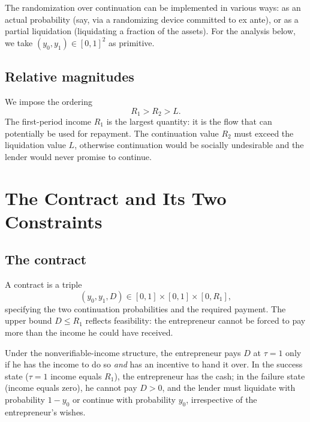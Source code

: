\documentclass[11pt,a4paper,oneside]{book}
\def\leq{\leqslant}
\theoremstyle{plain}
\theoremstyle{definition}
\theoremstyle{remark}
\numberwithin{equation}{chapter}
\begin{document}
The randomization over continuation can be implemented in various ways: as an actual probability (say, via a randomizing device committed to ex ante), or as a partial liquidation (liquidating a fraction of the assets).
For the analysis below, we take $(y_0, y_1) \in [0, 1]^2$ as primitive.

\subsection{Relative magnitudes}

We impose the ordering
\begin{equation}\label{eq:NV-ordering}
  R_1 > R_2 > L.
\end{equation}
The first-period income $R_1$ is the largest quantity: it is the flow that can potentially be used for repayment.
The continuation value $R_2$ must exceed the liquidation value $L$, otherwise continuation would be socially undesirable and the lender would never promise to continue.

\section{The Contract and Its Two Constraints}
\label{sec:NV-contract}

\subsection{The contract}

A contract is a triple
\begin{equation*}
  (y_0, y_1, D) \in [0,1] \times [0,1] \times [0, R_1],
\end{equation*}
specifying the two continuation probabilities and the required payment.
The upper bound $D \leq R_1$ reflects feasibility: the entrepreneur cannot be forced to pay more than the income he could have received.

Under the nonverifiable-income structure, the entrepreneur pays $D$ at $\tau = 1$ only if he has the income to do so \emph{and} has an incentive to hand it over.
In the success state ($\tau = 1$ income equals $R_1$), the entrepreneur has the cash; in the failure state (income equals zero), he cannot pay $D > 0$, and the lender must liquidate with probability $1 - y_0$ or continue with probability $y_0$, irrespective of the entrepreneur's wishes.
\end{document}
